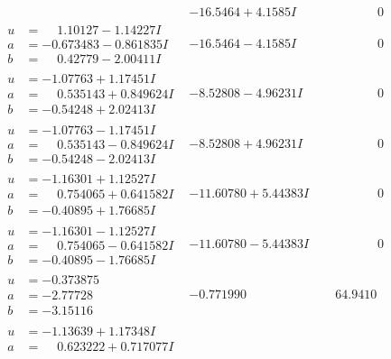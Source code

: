 \documentclass[1p]{elsarticle_modified}
\theoremstyle{definition}
\begin{document}
$$\begin{array}{c|c|c}
 & -16.5464 + 4.1585 I & \phantom{-0.000000 } 0 \\ \hline\begin{aligned}
u &= \phantom{-}1.10127 - 1.14227 I \\
a &= -0.673483 - 0.861835 I \\
b &= \phantom{-}0.42779 - 2.00411 I\end{aligned}
 & -16.5464 - 4.1585 I & \phantom{-0.000000 } 0 \\ \hline\begin{aligned}
u &= -1.07763 + 1.17451 I \\
a &= \phantom{-}0.535143 + 0.849624 I \\
b &= -0.54248 + 2.02413 I\end{aligned}
 & -8.52808 - 4.96231 I & \phantom{-0.000000 } 0 \\ \hline\begin{aligned}
u &= -1.07763 - 1.17451 I \\
a &= \phantom{-}0.535143 - 0.849624 I \\
b &= -0.54248 - 2.02413 I\end{aligned}
 & -8.52808 + 4.96231 I & \phantom{-0.000000 } 0 \\ \hline\begin{aligned}
u &= -1.16301 + 1.12527 I \\
a &= \phantom{-}0.754065 + 0.641582 I \\
b &= -0.40895 + 1.76685 I\end{aligned}
 & -11.60780 + 5.44383 I & \phantom{-0.000000 } 0 \\ \hline\begin{aligned}
u &= -1.16301 - 1.12527 I \\
a &= \phantom{-}0.754065 - 0.641582 I \\
b &= -0.40895 - 1.76685 I\end{aligned}
 & -11.60780 - 5.44383 I & \phantom{-0.000000 } 0 \\ \hline\begin{aligned}
u &= -0.373875\phantom{ +0.000000I} \\
a &= -2.77728\phantom{ +0.000000I} \\
b &= -3.15116\phantom{ +0.000000I}\end{aligned}
 & -0.771990\phantom{ +0.000000I} & \phantom{-}64.9410\phantom{ +0.000000I} \\ \hline\begin{aligned}
u &= -1.13639 + 1.17348 I \\
a &= \phantom{-}0.623222 + 0.717077 I \\

\end{aligned}
\end{array}$$
\end{document}
